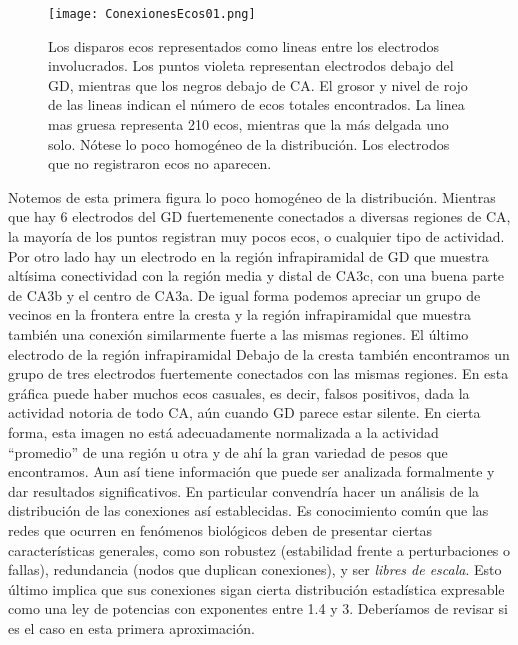 \documentclass{article}
\begin{document}
\begin{figure}[h]
\centering
\texttt{[image: ConexionesEcos01.png]}
\caption{ Los disparos ecos representados como lineas entre
los electrodos involucrados. Los puntos violeta representan 
electrodos debajo del GD, mientras que los negros
debajo de CA. El grosor y nivel de rojo de las lineas indican
el número de ecos totales encontrados. La linea mas gruesa
representa 210 ecos, mientras que la más delgada uno solo. 
Nótese lo poco homogéneo de la distribución. Los electrodos
que no registraron ecos no aparecen. 
}\label{EcosTotales}
\end{figure}

Notemos de esta primera figura lo poco homogéneo de la distribución.
Mientras que hay 6 electrodos del GD fuertemenente conectados
a diversas regiones de CA, la mayoría de los puntos registran muy pocos
ecos, o cualquier tipo de actividad.
Por otro lado hay un electrodo en
la región infrapiramidal de GD que muestra altísima conectividad con
la región media y distal de CA3c, con una buena parte de CA3b y el
centro de CA3a. De igual forma podemos apreciar un grupo de vecinos
en la frontera entre la cresta y la región infrapiramidal que
muestra también una conexión similarmente fuerte a 
las mismas regiones. El último electrodo de la región infrapiramidal
Debajo de la cresta también encontramos un grupo de tres electrodos
fuertemente conectados con las mismas regiones. En esta gráfica
puede haber muchos ecos casuales, es decir, falsos positivos,
dada la actividad notoria de todo CA, aún cuando GD parece 
estar silente. En cierta forma, esta imagen no está adecuadamente
normalizada a la actividad ``promedio'' de una región u otra y
de ahí la gran variedad de pesos que encontramos. Aun así
tiene información que puede ser analizada formalmente y
dar resultados significativos. En particular convendría 
hacer un análisis de la distribución de las conexiones así establecidas.
Es conocimiento común que las redes que ocurren en fenómenos biológicos
deben de presentar ciertas características generales, como son 
robustez (estabilidad frente a perturbaciones o fallas), redundancia
(nodos que duplican conexiones), y ser \emph{libres de escala}.
Esto último implica que sus conexiones sigan cierta distribución estadística
expresable como una ley de potencias con exponentes entre 1.4 y 3.
Deberíamos de revisar si es el caso en esta primera aproximación. 
\end{document}

